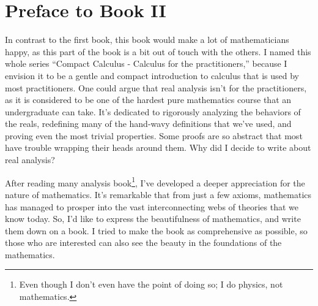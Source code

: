 \chapter*{Preface to Book II}

In contrast to the first book, this book would make a lot of mathematicians happy, as this part of the book is a bit out of touch with the others. I named this whole series \enquote{Compact Calculus - Calculus for the practitioners,} because I envision it to be a gentle and compact introduction to calculus that is used by most practitioners. One could argue that real analysis isn't for the practitioners, as it is considered to be one of the hardest pure mathematics course that an undergraduate can take. It's dedicated to rigorously analyzing the behaviors of the reals, redefining many of the hand-wavy definitions that we've used, and proving even the most trivial properties. Some proofs are so abstract that most have trouble wrapping their heads around them. Why did I decide to write about real analysis?

After reading many analysis book\footnote{Even though I don't even have the point of doing so; I do physics, not mathematics.}, I've developed a deeper appreciation for the nature of mathematics. It's remarkable that from just a few axioms, mathematics has managed to prosper into the vast interconnecting webs of theories that we know today. So, I'd like to express the beautifulness of mathematics, and write them down on a book. I tried to make the book as comprehensive as possible, so those who are interested can also see the beauty in the foundations of the mathematics.
